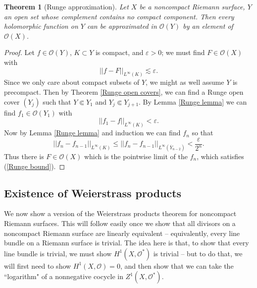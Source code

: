 \documentclass[reqno,12pt,letterpaper]{amsart}
\newcommand{\Olo}{\mathscr O}
\newtheorem{theorem}{Theorem}[section]
\theoremstyle{definition}
\begin{document}
\begin{theorem}[Runge approximation]
Let $X$ be a noncompact Riemann surface, $Y$ an open set whose complement contains no compact component.
Then every holomorphic function on $Y$ can be approximated in $\Olo(Y)$ by an element of $\Olo(X)$.
\end{theorem}
\begin{proof}
Let $f \in \Olo(Y)$, $K \subset Y$ is compact, and $\varepsilon > 0$; we must find $F \in \Olo(X)$ with
\begin{equation}
\label{Runge bound}
||f - F||_{L^\infty(K)} \lesssim \varepsilon.
\end{equation}
Since we only care about compact subsets of $Y$, we might as well assume $Y$ is precompact.
Then by Theorem \ref{Runge open covers}, we can find a Runge open cover $(Y_j)$ such that $Y \Subset Y_1$ and $Y_j \Subset Y_{j+1}$.
By Lemma \ref{Runge lemma} we can find $f_1 \in \Olo(Y_1)$ with
$$||f_1 - f||_{L^\infty(K)} < \varepsilon.$$
Now by Lemma \ref{Runge lemma} and induction we can find $f_n$ so that
$$||f_n - f_{n-1}||_{L^\infty(K)} \leq ||f_n - f_{n-1}||_{L^\infty(\overline Y_{n-2})} < \frac{\varepsilon}{2^n}.$$
Thus there is $F \in \Olo(X)$ which is the pointwise limit of the $f_n$, which satisfies (\ref{Runge bound}).
\end{proof}

\subsection{Existence of Weierstrass products}
We now show a version of the Weierstrass products theorem for noncompact Riemann surfaces.
This will follow easily once we show that all divisors on a noncompact Riemann surface are linearly equivalent -- equivalently, every line bundle on a Riemann surface is trivial.
The idea here is that, to show that every line bundle is trivial, we must show $H^1(X, \Olo^*)$ is trivial -- but to do that, we will first need to show $H^1(X, \Olo) = 0$, and then show that we can take the ``logarithm" of a nonnegative cocycle in $Z^1(X, \Olo^*)$.
\end{document}
